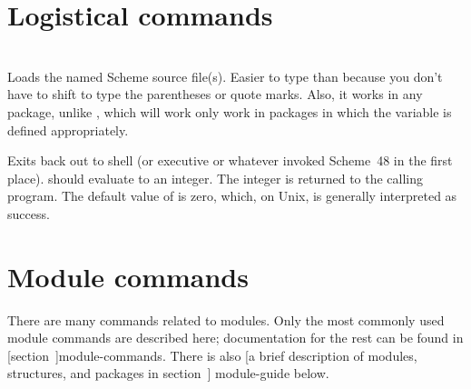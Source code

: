 \section{Logistical commands}
\begin{description}
\item {}\\
    Loads the named Scheme source file(s).
    Easier to type than  because you don't have to
    shift to type the parentheses or quote marks.  Also, it works in
    any package, unlike , which will work only
    work in packages in which the variable  is defined appropriately.

\item {}
    Exits back out to shell (or executive or whatever invoked Scheme~48
    in the first place).
     should evaluate to an integer.  The
    integer is returned to the calling program.
    The default value of  is zero, which, on Unix,
    is generally interpreted as success.
\end{description}

\section{Module commands}
\label{module-command-guide}

There are many commands related to modules.
Only the most commonly used module commands are described here;
 documentation for the
 rest can be found in [section~\Ref]{module-commands}.
There is also
[a brief description of modules, structures, and packages in section~\Ref]
{module-guide} below.

